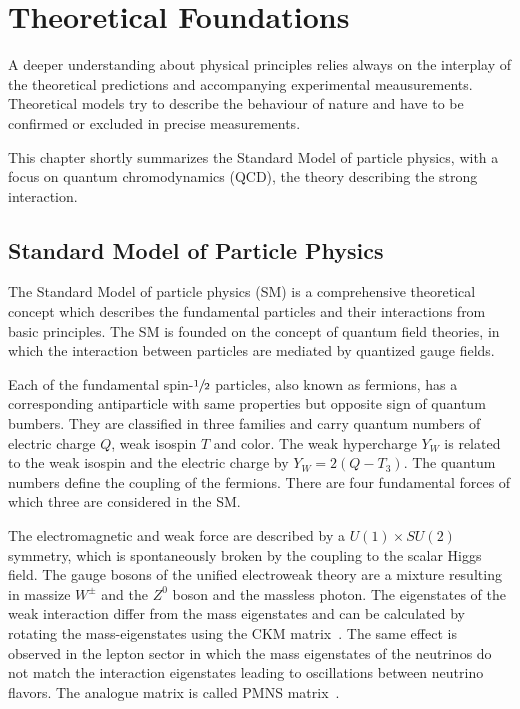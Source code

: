 
\chapter{Theoretical Foundations}
\label{sec:theoretical_foundations}

A deeper understanding about physical principles relies always on the interplay
of the theoretical predictions and accompanying experimental meausurements.
Theoretical models try to describe the behaviour of nature and have to be
confirmed or excluded in precise measurements.

This chapter shortly summarizes the Standard Model of particle physics, with a
focus on quantum chromodynamics (QCD), the theory describing the strong
interaction.

\section{Standard Model of Particle Physics}

The Standard Model of particle physics (SM) is a comprehensive theoretical
concept which describes the fundamental particles and their interactions from
basic principles. The SM is founded on the concept of quantum field theories, in
which the interaction between particles are mediated by quantized gauge fields.

Each of the fundamental spin-$\sfrac{1}{2}$ particles, also known as fermions,
has a corresponding antiparticle with same properties but opposite sign of
quantum bumbers. They are classified in three families and carry quantum numbers
of electric charge $Q$, weak isospin $T$ and color. The weak hypercharge $Y_W$
is related to the weak isospin and the electric charge by $Y_W = 2(Q-T_3)$. The
quantum numbers define the coupling of the fermions. There are four fundamental
forces of which three are considered in the SM.

The electromagnetic and weak force are described by a $U(1)\times SU(2)$
symmetry, which is spontaneously broken by the coupling to the scalar Higgs
field. The gauge bosons of the unified electroweak theory are a mixture
resulting in massize $W^\pm$ and the $Z^0$ boson and the massless photon. The
eigenstates of the weak interaction differ from the mass eigenstates and can be
calculated by rotating the mass-eigenstates using the CKM
matrix~\cite{Cabibbo:1963yz,Kobayashi:1973fv}. The
same effect is observed in the lepton sector in which the mass eigenstates of
the neutrinos do not match the interaction eigenstates leading to oscillations
between neutrino flavors. The analogue matrix is called PMNS
matrix~\cite{Maki:1962mu,Pontecorvo:1957qd}.


